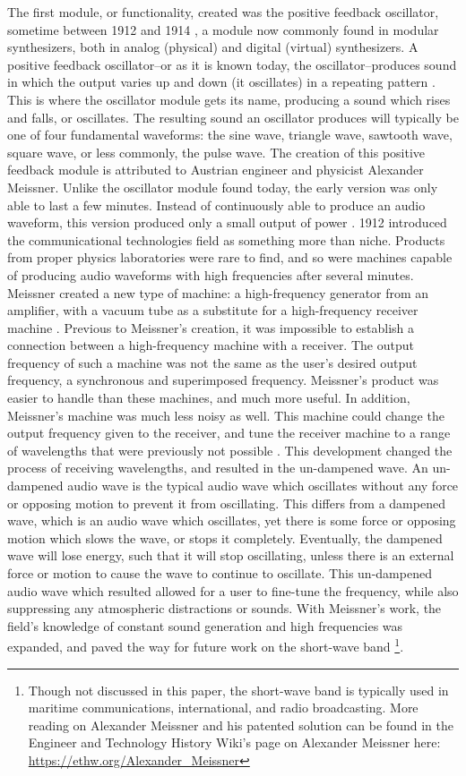 The first module, or functionality, created was the positive feedback oscillator, sometime between 1912 and 1914 \cite{Gabrielli_2020}, a module now commonly found in modular synthesizers, both in analog (physical) and digital (virtual) synthesizers. A positive feedback oscillator--or as it is known today, the oscillator--produces sound in which the output varies up and down (it oscillates) in a repeating pattern \cite{Meyer_2016}.  This is where the oscillator module gets its name, producing a sound which rises and falls, or oscillates. The resulting sound an oscillator produces will typically be one of four fundamental waveforms: the sine wave, triangle wave, sawtooth wave, square wave, or less commonly, the pulse wave. The creation of this positive feedback module is attributed to Austrian engineer and physicist Alexander Meissner. Unlike the oscillator module found today, the early version was only able to last a few minutes. Instead of continuously able to produce an audio waveform, this version produced only a small output of power \cite{Fleming_1919}. 1912 introduced the communicational technologies field as something more than niche. Products from proper physics laboratories were rare to find, and so were machines capable of producing audio waveforms with high frequencies after several minutes. Meissner created a new type of machine: a high-frequency generator from an amplifier, with a vacuum tube as a substitute for a high-frequency receiver machine  \cite{Fleming_1919}. Previous to Meissner's creation, it was impossible to establish a connection between a high-frequency machine with a receiver. The output frequency of such a machine was not the same as the user's desired output frequency, a synchronous and superimposed frequency. Meissner's product was easier to handle than these machines, and much more useful. In addition, Meissner's machine was much less noisy as well. This machine could change the output frequency given to the receiver, and tune the receiver machine to a range of wavelengths that were previously not possible  \cite{Fleming_1919}. This development changed the process of receiving wavelengths, and resulted in the un-dampened wave. An un-dampened audio wave is the typical audio wave which oscillates without any force or opposing motion to prevent it from oscillating. This differs from a dampened wave, which is an audio wave which oscillates, yet there is some force or opposing motion which slows the wave, or stops it completely. Eventually, the dampened wave will lose energy, such that it will stop oscillating, unless there is an external force or motion to cause the wave to continue to oscillate. This un-dampened audio wave which resulted allowed for a user to fine-tune the frequency, while also suppressing any atmospheric distractions or sounds. With Meissner's work, the field's knowledge of constant sound generation and high frequencies was expanded, and paved the way for future work on the short-wave band \footnote{Though not discussed in this paper, the short-wave band is typically used in maritime communications, international, and radio broadcasting. More reading on Alexander Meissner and his patented solution can be found in the Engineer and Technology History Wiki's page on Alexander Meissner here: \url{https://ethw.org/Alexander_Meissner}}.

